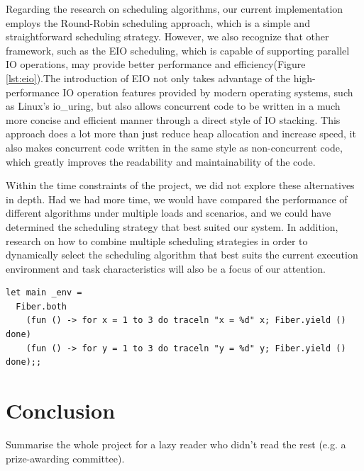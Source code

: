 \documentclass{l4proj}
\begin{document}
Regarding the research on scheduling algorithms, our current implementation employs the Round-Robin scheduling approach, which is a simple and straightforward scheduling strategy. However, we also recognize that other framework, such as the EIO scheduling, which is capable of supporting parallel IO operations, may provide better performance and efficiency(Figure \ref{lst:eio}).The introduction of EIO not only takes advantage of the high-performance IO operation features provided by modern operating systems, such as Linux's io\_uring, but also allows concurrent code to be written in a much more concise and efficient manner through a direct style of IO stacking. This approach does a lot more than just reduce heap allocation and increase speed, it also makes concurrent code written in the same style as non-concurrent code, which greatly improves the readability and maintainability of the code.

Within the time constraints of the project, we did not explore these alternatives in depth. Had we had more time, we would have compared the performance of different algorithms under multiple loads and scenarios, and we could have determined the scheduling strategy that best suited our system. In addition, research on how to combine multiple scheduling strategies in order to dynamically select the scheduling algorithm that best suits the current execution environment and task characteristics will also be a focus of our attention.

\noindent\begin{minipage}{\linewidth}
\lstset{style=ocamlstyle}
\begin{lstlisting}[caption={Example of running two threads of execution concurrently using Eio.Fiber \colorbox{yellow}{referenceHere}}, label={lst:eio}]
let main _env =
  Fiber.both
    (fun () -> for x = 1 to 3 do traceln "x = %d" x; Fiber.yield () done)
    (fun () -> for y = 1 to 3 do traceln "y = %d" y; Fiber.yield () done);;
\end{lstlisting}
\end{minipage}


\chapter{Conclusion}    
Summarise the whole project for a lazy reader who didn't read the rest (e.g. a prize-awarding committee).
\end{document}
